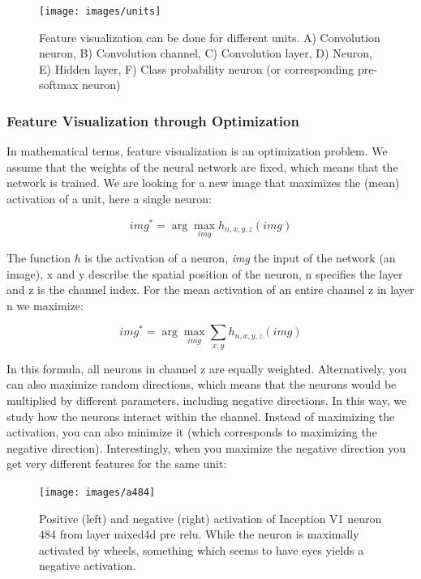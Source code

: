 \documentclass[
  11pt,
]{scrbook}
\begin{document}
\begin{figure}

{\centering \texttt{[image: images/units]} 

}

\caption{Feature visualization can be done for different units. A) Convolution neuron, B) Convolution channel, C) Convolution layer, D) Neuron, E) Hidden layer, F) Class probability neuron (or corresponding pre-softmax neuron)}\label{fig:units}
\end{figure}

\hypertarget{feature-visualization-through-optimization}{%
\subsubsection{Feature Visualization through Optimization}\label{feature-visualization-through-optimization}}

In mathematical terms, feature visualization is an optimization problem.
We assume that the weights of the neural network are fixed, which means that the network is trained.
We are looking for a new image that maximizes the (mean) activation of a unit, here a single neuron:

\[img^*=\arg\max_{img}h_{n,x,y,z}(img)\]

The function \(h\) is the activation of a neuron, \emph{img} the input of the network (an image), x and y describe the spatial position of the neuron, n specifies the layer and z is the channel index.
For the mean activation of an entire channel z in layer n we maximize:

\[img^*=\arg\max_{img}\sum_{x,y}h_{n,x,y,z}(img)\]

In this formula, all neurons in channel z are equally weighted.
Alternatively, you can also maximize random directions, which means that the neurons would be multiplied by different parameters, including negative directions.
In this way, we study how the neurons interact within the channel.
Instead of maximizing the activation, you can also minimize it (which corresponds to maximizing the negative direction).
Interestingly, when you maximize the negative direction you get very different features for the same unit:

\begin{figure}

{\centering \texttt{[image: images/a484]} 

}

\caption{Positive (left) and negative (right) activation of Inception V1 neuron 484 from layer mixed4d pre relu. While the neuron is maximally activated by wheels, something which seems to have eyes yields a negative activation.}\label{fig:pos-neg}
\end{figure}
\end{document}
